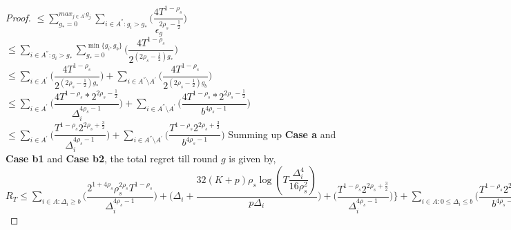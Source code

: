 \begin{proof}
\newline
\hspace*{0em}$\leq\sum_{g_{*}=0}^{max_{j\in A^{'}}g_{j}}\sum_{i\in A^{''}:g_{i}>g_{*}}\bigg(\dfrac{4 T^{1-\rho_{s}}}{\epsilon_{g}^{2\rho_{s} - \frac{1}{2}}} \bigg) $
\newline
\hspace*{0em}$\leq\sum_{i\in A^{''}:g_{i}>g_{*}}\sum_{g_{*}=0}^{\min{\lbrace g_{i},g_{b}\rbrace}}\bigg(\dfrac{4T^{1-\rho_{s}}}{2^{({2\rho_{s} - \frac{1}{2}})g_{*}}} \bigg) $
\newline
\hspace*{0em}$\leq\sum_{i\in A^{'}}\bigg(\dfrac{4T^{1-\rho_{s}}}{2^{({2\rho_{s} - \frac{1}{2}})g_{*}}} \bigg)+\sum_{i\in A^{''}\setminus A^{'}}\bigg(\dfrac{4T^{1-\rho_{s}}}{2^{({2\rho_{s} - \frac{1}{2}})g_{b}}} \bigg)$
\newline
\hspace*{0em}$\leq\sum_{i\in A^{'}}\bigg(\dfrac{4T^{1-\rho_{s}}*2^{2\rho_{s}-\frac{1}{2}}}{\Delta_{i}^{4\rho_{s}-1}} \bigg)+\sum_{i\in A^{''}\setminus A^{'}}\bigg(\dfrac{4T^{1-\rho_{s}}*2^{2\rho_{s}-\frac{1}{2}}}{b^{4\rho_{s}-1}} \bigg)$
\newline
\hspace*{0em}$\leq\sum_{i\in A^{'}}\bigg(\dfrac{T^{1-\rho_{s}}2^{2\rho_{s}+\frac{3}{2}}}{\Delta_{i}^{4\rho_{s}-1}} \bigg)+\sum_{i\in A^{''}\setminus A^{'}}\bigg(\dfrac{T^{1-\rho_{s}}2^{2\rho_{s}+\frac{3}{2}}}{b^{4\rho_{s}-1}} \bigg)$
\newline
Summing up \textbf{Case a} and \textbf{Case b1} and \textbf{Case b2}, the total regret till round $g$ is given by,
\newline $R_{T}\leq \sum_{i\in A:\Delta_{i}\geq b}\bigg(\dfrac{2^{1+4\rho_{s}}\rho_{s}^{2\rho_{s}}T^{1-\rho_{s}}}{\Delta_{i}^{4\rho_{s}-1}}\bigg) + \bigg(\Delta_{i}+\dfrac{32(K+p)\rho_{s}\log{(T\dfrac{\Delta_{i}^{4}}{16\rho_{s}^{2}})}}{p\Delta_{i}}\bigg)  +  \bigg(\dfrac{T^{1-\rho_{s}}2^{2\rho_{s}+\frac{3}{2}}}{\Delta_{i}^{4\rho_{s} -1}} \bigg) \bigg \rbrace+\sum_{i\in A:0\leq\Delta_{i}\leq b}\bigg(\dfrac{T^{1-\rho_{s}}2^{2\rho_{s}+\frac{3}{2}}}{b^{4\rho_{s} -1}} \bigg) + max_{i:\Delta\leq b}\Delta_{i}T$


\end{proof}
